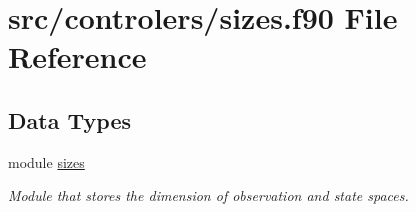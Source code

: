 \hypertarget{sizes_8f90}{\section{src/controlers/sizes.f90 File Reference}
\label{sizes_8f90}
}
\subsection*{Data Types}
\begin{DoxyCompactItemize}
\item 
module \hyperlink{classsizes}{sizes}
\begin{DoxyCompactList}\small\item\em Module that stores the dimension of observation and state spaces. \end{DoxyCompactList}\end{DoxyCompactItemize}
